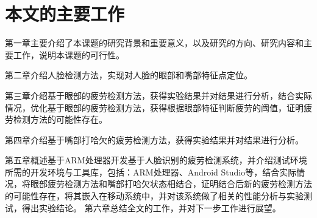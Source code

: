 \section{本文的主要工作}

第一章主要介绍了本课题的研究背景和重要意义，以及研究的方向、研究内容和主要工作，说明本课题的可行性。

第二章介绍人脸检测方法，实现对人脸的眼部和嘴部特征点定位。

第三章介绍基于眼部的疲劳检测方法，获得实验结果并对结果进行分析，结合实际情况，优化基于眼部的疲劳检测方法，获得根据眼部特征判断疲劳的阈值，证明疲劳检测方法的可能性存在。

第四章介绍基于嘴部打哈欠的疲劳检测方法，获得实验结果并对结果进行分析。

第五章概述基于ARM处理器开发基于人脸识别的疲劳检测系统，并介绍测试环境所需的开发环境与工具库，包括：ARM处理器、Android Studio等，结合实际情况，将眼部疲劳检测方法和嘴部打哈欠状态相结合，证明结合后新的疲劳检测方法的可能性存在，将其嵌入在移动系统中，并对该系统做了相关的性能分析与实验测试，得出实验结论。
第六章总结全文的工作，并对下一步工作进行展望。





























